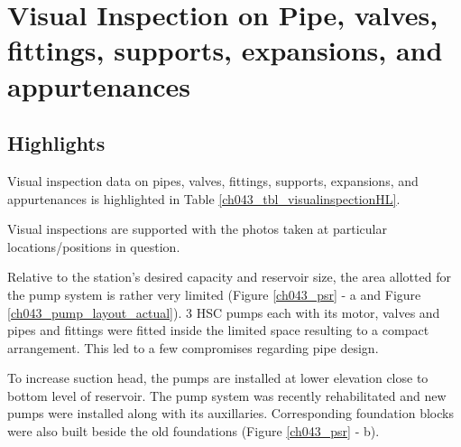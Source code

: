 %

\section{Visual Inspection on Pipe, valves, fittings, supports, expansions, and appurtenances}
\label{ch04mech02}


\subsection{Highlights}
\label{ch04mech02_highlight}


Visual inspection data on pipes, valves, fittings, supports, expansions, and appurtenances is highlighted in Table \ref{ch043_tbl_visualinspectionHL}.



Visual inspections are supported with the photos taken at particular locations/positions in question.

Relative to the station's desired capacity and reservoir size, the area allotted for the pump system is rather very limited (Figure \ref{ch043_psr} - a and Figure \ref{ch043_pump_layout_actual}). 3 HSC pumps each with its motor, valves and pipes and fittings were fitted inside the limited space resulting to a compact arrangement. This led to a few compromises regarding pipe design.

To increase suction head, the pumps are installed at lower elevation close to bottom level of reservoir. The pump system was recently rehabilitated and new pumps were installed along with its auxillaries. Corresponding foundation blocks were also built beside the old foundations (Figure \ref{ch043_psr} - b).

